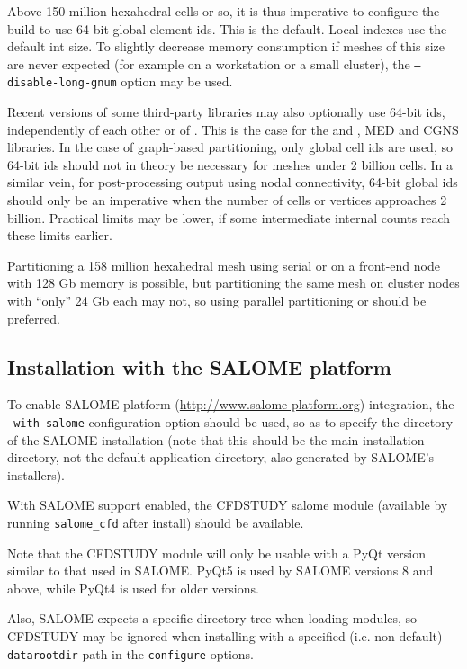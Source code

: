 \documentclass[a4paper,10pt,twoside]{csshortdoc}
\begin{document}
Above 150 million hexahedral cells or so, it is thus imperative to configure
the build to use 64-bit global element ids. This is the default.
Local indexes use the default {int} size. To slightly decrease memory
consumption if meshes of this size are never expected (for example on a workstation
or a small cluster), the {\tt --disable-long-gnum} option may be used.

Recent versions of some third-party libraries may also optionally use 64-bit ids,
independently of each other or of \CS.
This is the case for the \scotch and \metis, MED and
CGNS libraries. In the case of graph-based partitioning, only
global cell ids are used, so 64-bit ids should not in theory be necessary
for meshes under 2 billion cells. In a similar vein, for post-processing output
using nodal connectivity, 64-bit global ids should only be an imperative
when the number of cells or vertices approaches 2 billion.
Practical limits may be lower, if some intermediate internal counts
reach these limits earlier.

Partitioning a 158 million hexahedral mesh using serial  or \scotch
on a front-end node with 128 Gb memory is possible,
but partitioning the same mesh on cluster nodes with ``only'' 24 Gb each
may not, so using parallel partitioning \ptscotch or \parmetis
should be preferred.

\subsection{Installation with the SALOME platform\label{sec:config:salome}}

To enable SALOME platform (\url{http://www.salome-platform.org}) integration,
the \texttt{--with-salome} configuration option should be used, so as to
specify the directory of the SALOME installation (note that this should be
the main installation directory, not the default application directory,
also generated by SALOME's installers).

With SALOME support enabled, the CFDSTUDY salome module
(available by running \texttt{salome\_cfd} after install)
should be available.

Note that the CFDSTUDY module will only be usable with a PyQt
version similar to that used in SALOME. PyQt5 is used by SALOME
versions 8 and above, while PyQt4 is used for older versions.

Also, SALOME expects a specific directory tree when loading modules,
so CFDSTUDY may be ignored when installing with a specified (i.e. non-default)
\texttt{--datarootdir} path in the \CS \texttt{configure} options.
\end{document}
